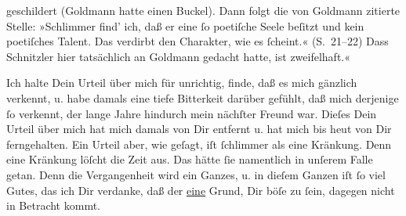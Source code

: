 {{{                  geschildert (Goldmann hatte einen Buckel).
                  Dann folgt die von Goldmann zitierte
                  Stelle: »Schlimmer find’
                        ich, daß er eine{ }ſo poetiſche Seele beſitzt und kein poetiſches Talent. Das
                        verdirbt den Charakter, wie es{ }ſcheint.«
                  (S. 21–22) Dass Schnitzler hier
                  tatsächlich an Goldmann gedacht hatte, ist
                  zweifelhaft.}}}\label{K_L03478-8}«\pend
           
\pstart
           Ich halte Dein Urteil über mich für unrichtig, finde, daß es mich gänzlich verkennt,
               u. habe \strikeout{\textcolor{gray}{d}} damals eine tiefe Bitterkeit darüber gefühlt, daß mich derjenige{ }ſo verkennt,
               der lange Jahre hindurch mein nächſter Freund war. Dieſes Dein Urteil über mich hat
               mich damals von Dir entfernt u. hat mich bis heut von Dir ferngehalten. Ein Urteil
               aber, wie geſagt, {\pb}iſt{ }ſchlimmer als eine
               Kränkung. Denn eine Kränkung löſcht die Zeit aus. Das hätte{ }ſie namentlich in unſerem
               Falle getan. \strikeout{\textcolor{gray}{S}} Denn die Vergangenheit wird ein Ganzes, u. in dieſem Ganzen iſt{ }ſo viel Gutes,
               das ich Dir verdanke, daß der \uline{eine} Grund, Dir böſe zu{ }ſein, dagegen nicht in Betracht kommt.\pend
           
